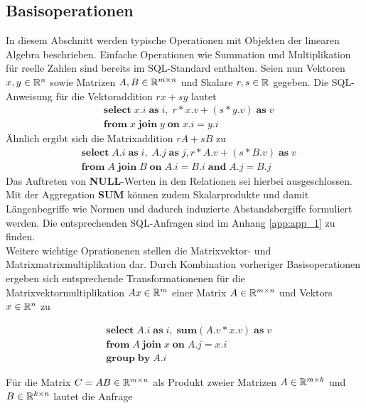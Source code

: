 \subsection{Basisoperationen}
\label{abs_basisoperationen}
In diesem Abschnitt werden typische Operationen mit Objekten der linearen Algebra beschrieben. Einfache Operationen wie Summation und Multiplikation für reelle Zahlen sind bereits im SQL-Standard enthalten. Seien nun Vektoren $x,y \in \mathbb{R}^n$ sowie Matrizen $A,B \in \mathbb{R}^{m \times n}$ und Skalare $r,s \in \mathbb{R}$ gegeben. Die SQL-Anweisung für die Vektoraddition $rx+sy$ lautet
\begin{align*}
    & \mathbf{select} \; x.i \; \mathbf{as} \; i, \; r*x.v+(s*y.v ) \; \mathbf{as} \; v \\
    & \mathbf{from} \; x \; \mathbf{join} \; y \; \mathbf{on} \; x.i=y.i
\end{align*}
Ähnlich ergibt sich die Matrixaddition $rA+sB$ zu
\begin{align*}
    & \mathbf{select} \; A.i \; \mathbf{as} \; i, \; A.j \; \mathbf{as} \; j, r*A.v+(s*B.v ) \; \mathbf{as} \; v \\
    & \mathbf{from} \; A \; \mathbf{join} \; B \; \mathbf{on} \; A.i=B.i \; \mathbf{and} \; A.j=B.j
\end{align*}
Das Auftreten von \textbf{NULL}-Werten in den Relationen sei hierbei ausgeschlossen. 
Mit der Aggregation \textbf{SUM} können zudem Skalarprodukte und damit Längenbegriffe wie Normen und dadurch induzierte Abstandsbergiffe formuliert werden. Die entsprechenden SQL-Anfragen  sind im Anhang \ref{app:app_1} zu finden. \\
Weitere wichtige Oprationenen stellen die Matrixvektor- und Matrixmatrixmultiplikation dar. 
Durch Kombination vorheriger Basisoperationen ergeben sich entsprechende Transformationenen für die Matrixvektormultiplikation $Ax \in \mathbb{R}^m$ einer Matrix $A \in \mathbb{R}^{m \times n}$ und Vektors $x \in \mathbb{R}^n$ zu

\begin{align*}
    & \mathbf{select} \; A.i \; \mathbf{as} \; i, \; \mathbf{sum} (A.v*x.v) \; \mathbf{as} \; v\\
    & \mathbf{from} \; A \; \mathbf{join} \; x \; \mathbf{on} \; A.j=x.i \; \\
    & \mathbf{group} \; \mathbf{by} \; A.i
\end{align*}

Für die Matrix $C=AB \in \mathbb{R}^{m \times n}$ als Produkt zweier Matrizen $A \in \mathbb{R}^{m \times k}$ und $B \in \mathbb{R}^{k \times n}$ lautet die Anfrage

